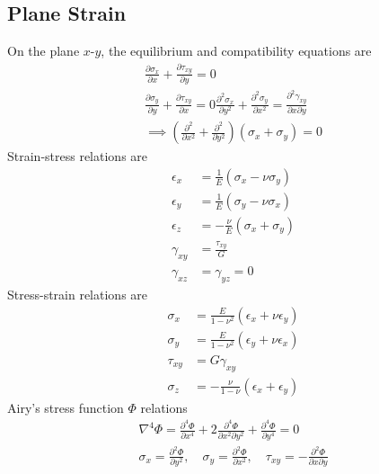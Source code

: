 \subsection*{Plane Strain}
On the plane $x$-$y$, the equilibrium and compatibility equations are
\begin{gather*}
    \frac{\partial \sigma_x}{\partial x} + \frac{\partial \tau_{xy}}{\partial y} = 0 \\
    \frac{\partial \sigma_y}{\partial y} + \frac{\partial \tau_{xy}}{\partial x} = 0
    \frac{\partial^2 \sigma_x}{\partial y^2} + \frac{\partial^2 \sigma_y}{\partial x^2} = \frac{\partial^2 \gamma_{xy}}{\partial x \partial y} \\
    \implies \left(\frac{\partial^2}{\partial x^2} + \frac{\partial^2}{\partial y^2}\right) (\sigma_x + \sigma_y) = 0
\end{gather*}
Strain-stress relations are
\begin{align*}
    \epsilon_x &= \frac{1}{E} \left( \sigma_x - \nu \sigma_y \right) \\
    \epsilon_y &= \frac{1}{E} \left( \sigma_y - \nu \sigma_x \right) \\
    \epsilon_z &= -\frac{\nu}{E} \left( \sigma_x + \sigma_y \right) \\
    \gamma_{xy} &= \frac{\tau_{xy}}{G} \\
    \gamma_{xz} &= \gamma_{yz} = 0 
\end{align*}
Stress-strain relations are
\begin{align*}
    \sigma_x &= \frac{E}{1-\nu^2} \left( \epsilon_x + \nu \epsilon_y \right) \\
    \sigma_y &= \frac{E}{1-\nu^2} \left( \epsilon_y + \nu \epsilon_x \right) \\
    \tau_{xy} &= G \gamma_{xy} \\
    \sigma_z &= -\frac{\nu}{1-\nu} \left( \epsilon_x + \epsilon_y \right)
\end{align*}
Airy's stress function $\Phi$ relations
\begin{gather*}
    \nabla^4 \Phi = \frac{\partial^4 \Phi}{\partial x^4} + 2 \frac{\partial^4 \Phi}{\partial x^2 \partial y^2} + \frac{\partial^4 \Phi}{\partial y^4} = 0\\
    \sigma_x = \frac{\partial^2 \Phi}{\partial y^2}, \quad \sigma_y = \frac{\partial^2 \Phi}{\partial x^2}, \quad \tau_{xy} = -\frac{\partial^2 \Phi}{\partial x \partial y}
\end{gather*}
